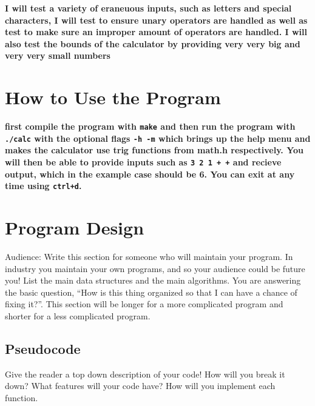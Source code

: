 \documentclass{article}
\begin{document}
\textbf{I will test a variety of eraneuous inputs, such as letters and special characters, I will test to ensure unary operators are handled as well as test to make sure an improper amount of operators are handled. I will also test the bounds of the calculator by providing very very big and very very small numbers}

\section*{How to Use the Program}

\textbf{first compile the program with \lstinline{make} and then run the program with \lstinline{./calc} with the optional flags \lstinline{-h -m} which brings up the help menu and makes the calculator use trig functions from math.h respectively. You will then be able to provide inputs such as \lstinline{3 2 1 + +} and recieve output, which in the example case should be 6. You can exit at any time using \lstinline{ctrl+d}.}

\section*{Program Design}

Audience: Write this section for someone
who will maintain your program.
In industry you maintain your own
programs, and so your audience could be
future you! List
the main data structures and the main
algorithms. You are answering the basic
question, ``How is this thing organized
so that I can have a chance of fixing
it?''. This section will be longer for a
more complicated program and shorter for
a less complicated program.

\subsection*{Pseudocode}
Give the reader a top down description of your code! How will you break it down? What features will your code have? 
How will you implement each function. 
\end{document}
